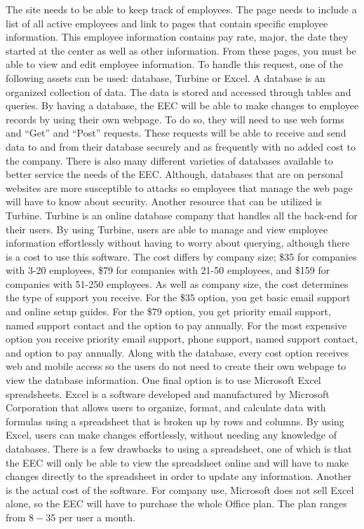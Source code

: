 \documentclass[letterpaper,10pt,titlepage,journal,compsoc,draftclsnofoot,onecolumn]{IEEEtran}
\newcommand\tab[1][1cm]{\hspace*{#1}}
\begin{document}
\tab The site needs to be able to keep track of employees. The page needs to include a list of  all active employees and link to pages that contain specific employee information. This employee information contains pay rate, major, the date they started at the center as well as other information. From these pages, you must be able to view and edit employee information. To handle this request, one of the following assets can be used: database, Turbine or Excel. \newline\newline\tab A database is an organized collection of data. The data is stored and accessed through tables and queries. By having a database, the EEC will be able to make changes to employee records by using their own webpage. To do so, they will need to use web forms and “Get” and “Post” requests. These requests will be able to receive and send data to and from their database securely and as frequently with no added cost to the company. There is also many different varieties of databases available to better service the needs of the EEC. Although, databases that are on personal websites are more susceptible to attacks so employees that manage the web page will have to know about security. \newline\newline\tab Another resource that can be utilized is Turbine. Turbine is an online database company that handles all the back-end for their users. By using Turbine, users are able to manage and view employee information effortlessly without having to worry about querying, although there is a cost to use this software. The cost differs by company size; \$35 for companies with 3-20 employees, \$79 for companies with 21-50 employees, and \$159 for companies with 51-250 employees. As well as company size, the cost determines the type of support you receive. For the \$35 option, you get basic email support and online setup guides. For the \$79 option, you get priority email support, named support contact and the option to pay annually. For the most expensive option you receive priority email support, phone support, named support contact, and option to pay annually. Along with the database, every cost option receives web and mobile access so the users do not need to create their own webpage to view the database information. \newline\newline\tab One final option is to use Microsoft Excel spreadsheets. Excel is a software developed and manufactured by Microsoft Corporation that allows users to organize, format, and calculate data with formulas using a spreadsheet that is broken up by rows and columns. By using Excel, users can make changes effortlessly, without needing any knowledge of databases. There is a few drawbacks to using a spreadsheet, one of which is that the EEC will only be able to view the spreadsheet online and will have to make changes directly to the spreadsheet in order to update any information. Another is the actual cost of the software. For company use, Microsoft does not sell Excel alone, so the EEC will have to purchase the whole Office plan. The plan ranges from $8 - $35 per user a month. \newline
\end{document}
